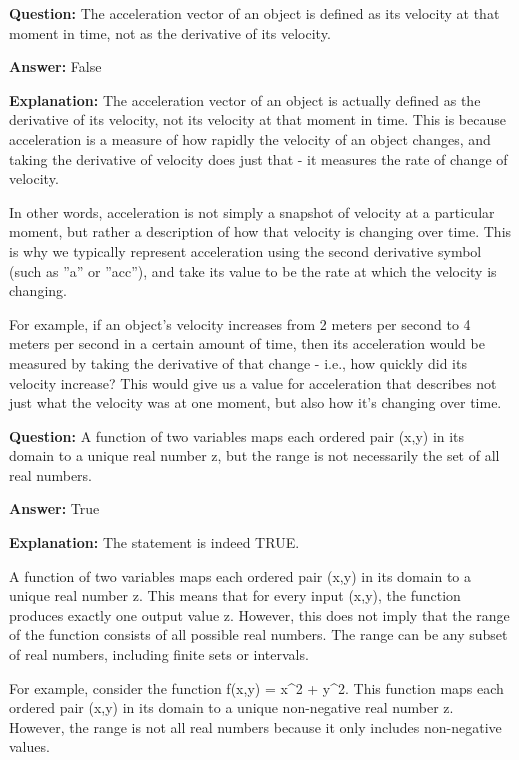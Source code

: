 \documentclass{article}
\begin{document}
            
                \textbf {Question:} The acceleration vector of an object is defined as its velocity at that moment in time, not as the derivative of its velocity.
                
                \textbf{Answer:} False

                \textbf{Explanation:} The acceleration vector of an object is actually defined as the derivative of its velocity, not its velocity at that moment in time. This is because acceleration is a measure of how rapidly the velocity of an object changes, and taking the derivative of velocity does just that - it measures the rate of change of velocity.

In other words, acceleration is not simply a snapshot of velocity at a particular moment, but rather a description of how that velocity is changing over time. This is why we typically represent acceleration using the second derivative symbol (such as ''a'' or ''acc''), and take its value to be the rate at which the velocity is changing.

For example, if an object's velocity increases from 2 meters per second to 4 meters per second in a certain amount of time, then its acceleration would be measured by taking the derivative of that change - i.e., how quickly did its velocity increase? This would give us a value for acceleration that describes not just what the velocity was at one moment, but also how it's changing over time.
                
                \vspace{0.5cm} 
        
            
                \textbf {Question:} A function of two variables maps each ordered pair (x,y) in its domain to a unique real number z, but the range is not necessarily the set of all real numbers.
                
                \textbf{Answer:} True

                \textbf{Explanation:} The statement is indeed TRUE.

A function of two variables maps each ordered pair (x,y) in its domain to a unique real number z. This means that for every input (x,y), the function produces exactly one output value z. However, this does not imply that the range of the function consists of all possible real numbers. The range can be any subset of real numbers, including finite sets or intervals.

For example, consider the function f(x,y) = x{\textasciicircum}2 + y{\textasciicircum}2. This function maps each ordered pair (x,y) in its domain to a unique non-negative real number z. However, the range is not all real numbers because it only includes non-negative values.
                
\end{document}
